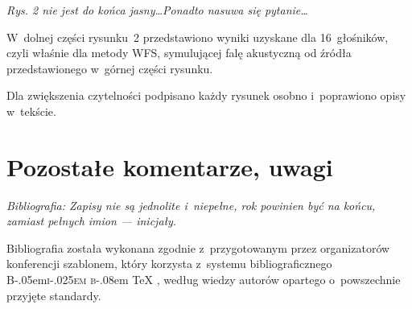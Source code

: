 \documentclass[12pt]{article}
\DeclareRobustCommand{\BibTeX}{%
  {\normalfont B\kern-.05em{\scshape i\kern-.025em b}\kern-.08em \TeX}%
}
\begin{document}
    \textit{Rys. 2 nie jest do końca jasny\dots Ponadto nasuwa się pytanie\dots}

    W~dolnej części rysunku~2 przedstawiono wyniki uzyskane dla 16~głośników, czyli właśnie dla metody WFS, symulującej falę akustyczną od źródła przedstawionego w~górnej części rysunku.

    Dla zwiększenia czytelności podpisano każdy rysunek osobno i~poprawiono opisy w~tekście.

    \section{Pozostałe komentarze, uwagi}

    \textit{Bibliografia: Zapisy nie są jednolite i~niepełne, rok powinien być na końcu, zamiast pełnych imion --- inicjały.}

    Bibliografia została wykonana zgodnie z~przygotowanym przez organizatorów konferencji szablonem, który korzysta z~systemu bibliograficznego \BibTeX, według wiedzy autorów opartego o~powszechnie przyjęte standardy.
\end{document}
